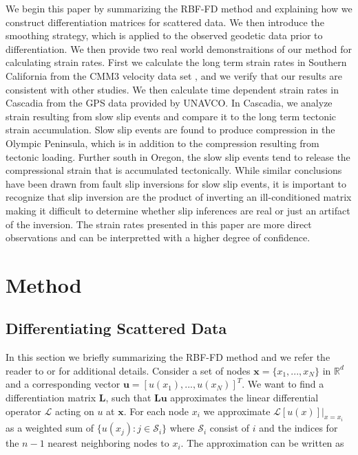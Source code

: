 \documentclass[10pt,a4paper]{article}
\begin{document}
We begin this paper by summarizing the RBF-FD method and explaining how we construct differentiation matrices for scattered data. We then introduce the smoothing strategy, which is applied to the observed geodetic data prior to differentiation.  We then provide two real world demonstraitions of our method for calculating strain rates.  First we calculate the long term strain rates in Southern California from the CMM3 velocity data set \citep{Shen2011}, and we verify that our results are consistent with other studies. We then calculate time dependent strain rates in Cascadia from the GPS data provided by UNAVCO.  In Cascadia, we analyze strain resulting from slow slip events and compare it to the long term tectonic strain accumulation. Slow slip events are found to produce compression in the Olympic Peninsula, which is in addition to the compression resulting from tectonic loading.  Further south in Oregon, the slow slip events tend to release the compressional strain that is accumulated tectonically.  While similar conclusions have been drawn from fault slip inversions for slow slip events, it is important to recognize that slip inversion are the product of inverting an ill-conditioned matrix making it difficult to determine whether slip inferences are real or just an artifact of the inversion.  The strain rates presented in this paper are more direct observations and can be interpretted with a higher degree of confidence. 

\section{Method}\label{sec:Method}
\subsection{Differentiating Scattered Data}\label{sec:Differentiating}

In this section we briefly summarizing the RBF-FD method and we refer the reader to \citet{Wright2006} or \citet{Fornberg2015} for additional details. Consider a set of nodes $\mathbf{x} = \{x_1, ..., x_N\}$ in $\mathbb{R}^d$ and a corresponding vector $\mathbf{u} = [u(x_1), ..., u(x_N)]^T$.  We want to find a differentiation matrix $\mathbf{L}$, such that $\mathbf{Lu}$ approximates the linear differential operator $\mathcal{L}$ acting on $u$ at $\mathbf{x}$.  For each node $x_i$ we approximate $\mathcal{L}[u(x)]\big|_{x=x_i}$ as a weighted sum of $\{u(x_j): j \in \mathcal{S}_i\}$ where $\mathcal{S}_i$ consist of $i$ and the indices for the $n-1$ nearest neighboring nodes to $x_i$.  The approximation can be written as
\end{document}
